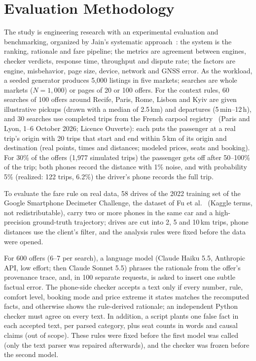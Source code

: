 \documentclass{svproc}
\begin{document}
\section{Evaluation Methodology}\label{sec:exp}
The study is engineering research with an experimental evaluation and benchmarking, organized by Jain's systematic approach~\cite{jain1991}: the system is the ranking, rationale and fare pipeline; the metrics are agreement between engines, checker verdicts, response time, throughput and dispute rate; the factors are engine, misbehavior, page size, device, network and GNSS error. As the workload, a seeded generator produces 5,000 listings in five markets; searches are whole markets ($N{=}1{,}000$) or pages of 20 or 100 offers. For the context rules, 60 searches of 100 offers around Recife, Paris, Rome, Lisbon and Kyiv are given illustrative pickups (drawn with a median of 2.5\,km) and departures (5\,min--12\,h), and 30 searches use completed trips from the French carpool registry~\cite{rpc2026} (Paris and Lyon, 1--6 October 2026; Licence Ouverte): each puts the passenger at a real trip's origin with 20 trips that start and end within 5\,km of its origin and destination (real points, times and distances; modeled prices, seats and booking). For 30\% of the offers (1,977 simulated trips) the passenger gets off after 50--100\% of the trip; both phones record the distance with 1\% noise, and with probability 5\% (realized: 122 trips, 6.2\%) the driver's phone records the full trip.

To evaluate the fare rule on real data, 58 drives of the 2022 training set of the Google Smartphone Decimeter Challenge, the dataset of Fu et al.~\cite{Fu2020GSDC} (Kaggle terms, not redistributable), carry two or more phones in the same car and a high-precision ground-truth trajectory; drives are cut into 2, 5 and 10\,km trips, phone distances use the client's filter, and the analysis rules were fixed before the data were opened.

For 600 offers (6--7 per search), a language model (Claude Haiku 5.5, Anthropic API, low effort; then Claude Sonnet 5.5) phrases the rationale from the offer's provenance trace, and, in 100 separate requests, is asked to insert one subtle factual error. The phone-side checker accepts a text only if every number, rule, comfort level, booking mode and price extreme it states matches the recomputed facts, and otherwise shows the rule-derived rationale; an independent Python checker must agree on every text. In addition, a script plants one false fact in each accepted text, per parsed category, plus seat counts in words and causal claims (out of scope). These rules were fixed before the first model was called (only the text parser was repaired afterwards), and the checker was frozen before the second model.
\end{document}
